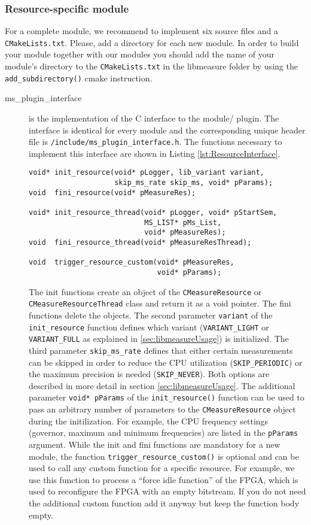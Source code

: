 \subsubsection{Resource-specific module}
For a complete module, we recommend to implement six source files and a \texttt{CMakeLists.txt}. Please, add a directory for each new module. In order to build your module together with our modules you should add the name of your module's directory to the \texttt{CMakeLists.txt} in the libmeasure folder by using the \texttt{add\_subdirectory()} cmake instruction.
\begin{description}
	\item[ms\_plugin\_interface] is the implementation of the C interface to the module/ plugin. The interface is identical for every module and the corresponding unique header file is \texttt{/include/ms\_plugin\_interface.h}. The functions necessary to implement this interface are shown in Listing \ref{lst:ResourceInterface}.
	\pagebreak
	
	\begin{lstlisting}[caption={Interface that each plugin must implement. \added[id=ck]{Angepasst}}, label=lst:ResourceInterface]
void* init_resource(void* pLogger, lib_variant variant,
					skip_ms_rate skip_ms, void* pParams);
void  fini_resource(void* pMeasureRes);

void* init_resource_thread(void* pLogger, void* pStartSem,
						   MS_LIST* pMs_List,
						   void* pMeasureRes);
void  fini_resource_thread(void* pMeasureResThread);

void  trigger_resource_custom(void* pMeasureRes,
							  void* pParams);
	\end{lstlisting}
	The init functions create an object of the \texttt{CMeasureResource} or \\ \texttt{CMeasureResourceThread} class and return it as a void pointer. The fini functions delete the objects.
	The second parameter \texttt{variant} of the \texttt{init\_resource} function defines which variant (\texttt{VARIANT\_LIGHT} or \\\texttt{VARIANT\_FULL} as explained in \ref{sec:libmeasureUsage}) is initialized. The third parameter \texttt{skip\_ms\_rate} defines that either certain measurements can be skipped in order to reduce the CPU utilization (\texttt{SKIP\_PERIODIC}) or the maximum precision is needed (\texttt{SKIP\_NEVER}). Both options are described in more detail in section \ref{sec:libmeasureUsage}.
	The additional parameter \texttt{void* pParams} of the \texttt{init\_resource()} function can be used to pass an arbitrary number of parameters to the \texttt{CMeasureResource} object during the initilization. For example, the CPU frequency settings (governor, maximum and minimum frequencies) are listed in the \texttt{pParams} argument. While the init and fini functions are mandatory for a new module, the function \texttt{trigger\_resource\_custom()} is optional and can be used to call any custom function for a specific resource. For example, we use this function to process a ``force idle function'' of the FPGA, which is used to reconfigure the FPGA with an empty bitstream. If you do not need the additional custom function add it anyway but keep the function body empty.
	

\end{description}
